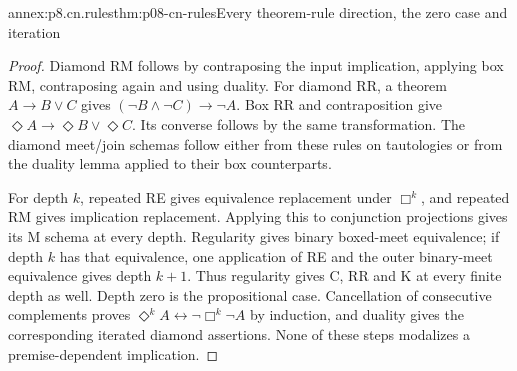 \begin{annexitem}{annex:p8.cn.rules}{thm:p08-cn-rules}{Every theorem-rule direction, the zero case and iteration}
\begin{proof}
Diamond RM follows by contraposing the input implication, applying
box RM, contraposing again and using duality. For diamond RR,
a theorem \(A\to B\lor C\) gives
\((\neg B\land\neg C)\to\neg A\). Box RR and
contraposition give \(\Diamond A\to\Diamond B\lor\Diamond C\).
Its converse follows by the same transformation. The diamond
meet/join schemas follow either from these rules on tautologies
or from the duality lemma applied to their box counterparts.

For depth \(k\), repeated RE gives equivalence replacement under
\(\Box^k\), and repeated RM gives implication replacement.
Applying this to conjunction projections gives its M schema at
every depth. Regularity gives binary boxed-meet equivalence;
if depth \(k\) has that equivalence, one application of RE
and the outer binary-meet equivalence gives depth \(k+1\).
Thus regularity gives C, RR and K at every finite depth as well.
Depth zero is the propositional case. Cancellation of consecutive
complements proves \(\Diamond^k A\leftrightarrow
\neg\Box^k\neg A\) by induction, and duality gives the
corresponding iterated diamond assertions. None of these steps
modalizes a premise-dependent implication.
\end{proof}
\end{annexitem}

